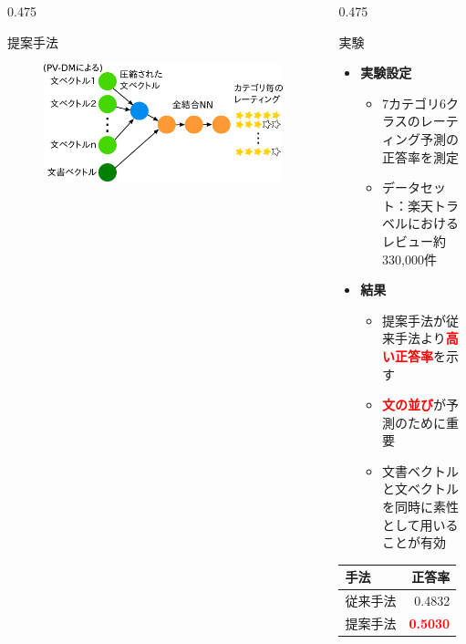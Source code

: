 \documentclass[unicode,10pt]{beamer}
\newcommand{\itemtitle}[1]{\textbf{#1}\\}
\newcommand{\fire}[1]{\textcolor{red}{\textbf{#1}}}
\newcommand{\columnsize}{0.475\textwidth}
\begin{document}
\begin{frame}
\begin{columns}[onlytextwidth,t]
\begin{column}{\columnsize}
  \begin{block}{提案手法}
    \begin{figure}
      \includegraphics[width=\linewidth]{fig/model.png}
    \end{figure}
  \end{block}
\end{column}

\begin{column}{\columnsize}
  \begin{block}{実験}
    \begin{itemize}
      \item \itemtitle{実験設定}
        \begin{itemize}
          \item 7カテゴリ6クラスのレーティング予測の正答率を測定
          \item データセット：楽天トラベルにおけるレビュー約330,000件
        \end{itemize}
      \item \itemtitle{結果}
        \begin{itemize}
          \item 提案手法が従来手法より\fire{高い正答率}を示す
          \item \fire{文の並び}が予測のために重要
          \item 文書ベクトルと文ベクトルを同時に素性として用いることが有効
        \end{itemize}
    \end{itemize}
    \begin{table}
      \centering
      \begin{tabular}{l | r}
        手法 & 正答率 \\
        \hline
        従来手法 & 0.4832 \\
        提案手法 & \fire{0.5030} \\
      \end{tabular}
    \end{table}
  \end{block}


\end{column}
\end{columns}
\end{frame}
\end{document}
